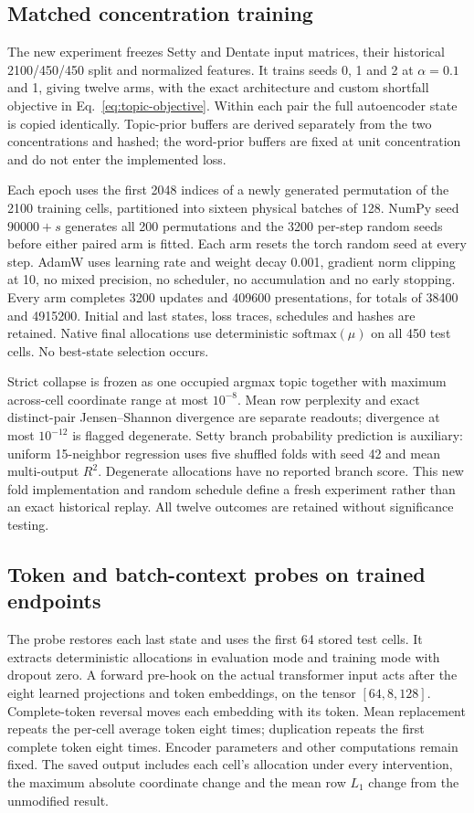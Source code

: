 \subsection{Matched concentration training}
The new experiment freezes Setty and Dentate input matrices, their historical 2100/450/450 split and normalized features. It trains seeds 0, 1 and 2 at $\alpha=0.1$ and 1, giving twelve arms, with the exact architecture and custom shortfall objective in Eq.~\ref{eq:topic-objective}. Within each pair the full autoencoder state is copied identically. Topic-prior buffers are derived separately from the two concentrations and hashed; the word-prior buffers are fixed at unit concentration and do not enter the implemented loss.

Each epoch uses the first 2048 indices of a newly generated permutation of the 2100 training cells, partitioned into sixteen physical batches of 128. NumPy seed $90000+s$ generates all 200 permutations and the 3200 per-step random seeds before either paired arm is fitted. Each arm resets the torch random seed at every step. AdamW uses learning rate and weight decay 0.001, gradient norm clipping at 10, no mixed precision, no scheduler, no accumulation and no early stopping. Every arm completes 3200 updates and 409600 presentations, for totals of 38400 and 4915200. Initial and last states, loss traces, schedules and hashes are retained. Native final allocations use deterministic $\mathrm{softmax}(\mu)$ on all 450 test cells. No best-state selection occurs.

Strict collapse is frozen as one occupied argmax topic together with maximum across-cell coordinate range at most $10^{-8}$. Mean row perplexity and exact distinct-pair Jensen--Shannon divergence are separate readouts; divergence at most $10^{-12}$ is flagged degenerate. Setty branch probability prediction is auxiliary: uniform 15-neighbor regression uses five shuffled folds with seed 42 and mean multi-output $R^2$. Degenerate allocations have no reported branch score. This new fold implementation and random schedule define a fresh experiment rather than an exact historical replay. All twelve outcomes are retained without significance testing.

\subsection{Token and batch-context probes on trained endpoints}
The probe restores each last state and uses the first 64 stored test cells. It extracts deterministic allocations in evaluation mode and training mode with dropout zero. A forward pre-hook on the actual transformer input acts after the eight learned projections and token embeddings, on the tensor $[64,8,128]$. Complete-token reversal moves each embedding with its token. Mean replacement repeats the per-cell average token eight times; duplication repeats the first complete token eight times. Encoder parameters and other computations remain fixed. The saved output includes each cell's allocation under every intervention, the maximum absolute coordinate change and the mean row $L_1$ change from the unmodified result.

